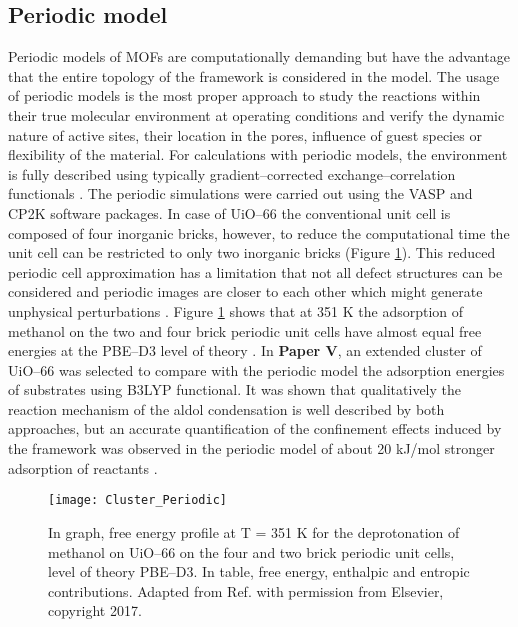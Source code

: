 \subsection*{Periodic model}
Periodic models of MOFs are computationally demanding but have the advantage
that the entire topology of the framework is considered in the model. The usage of periodic models is the most proper approach to study the reactions within
their true molecular environment at operating conditions and verify the dynamic
nature of active sites, their location in the pores, influence of guest species
or flexibility of the material. For calculations with periodic models, the
environment is fully described using typically
gradient--corrected exchange--correlation functionals \cite{Yang2010}. The
periodic simulations were carried out using the VASP and CP2K software packages.
In case of UiO--66 the conventional unit cell is composed of four inorganic
bricks, however, to reduce the computational time the unit cell can be
restricted to only two inorganic bricks (Figure \ref{fig:Cluster_Periodic}).
This reduced periodic cell approximation has a limitation that not all defect structures can be considered and periodic images
are closer to each other which might generate unphysical
perturbations \cite{Waroquier2017}.
\npar
Figure \ref{fig:Cluster_Periodic} shows that at 351 K the
adsorption of methanol on the two and four brick periodic unit
cells have almost equal free energies at the PBE--D3 level of theory
\cite{Caratelli2017}.
In \textbf{Paper V}, an extended cluster of UiO--66 was selected to compare with the periodic model the adsorption energies of
substrates using B3LYP functional.
It was shown that qualitatively the reaction mechanism of the aldol
condensation is well described by both approaches, but an accurate
quantification of the confinement effects induced by the framework was observed
in the periodic model of about 20 kJ/mol stronger adsorption of reactants
\cite{Hajek2015}.

\begin{figure}[!htp]
	\centering
	\texttt{[image: Cluster\_Periodic]}
	\caption[In graph, free energy profile at T = 351 K for the deprotonation of
	methanol on UiO--66 on the four and two brick periodic unit cells, level of
	theory PBE--D3. In table, free energy, enthalpic and entropic
	contributions.]{ In graph, free energy profile at T = 351 K for the deprotonation
	of methanol on UiO--66 on the four and two brick periodic unit cells, level of
	theory PBE--D3. In table, free energy, enthalpic and entropic
	contributions. Adapted from Ref. \cite{Caratelli2017} with permission from
	Elsevier, copyright 2017.}
	\label{fig:Cluster_Periodic}
\end{figure}

